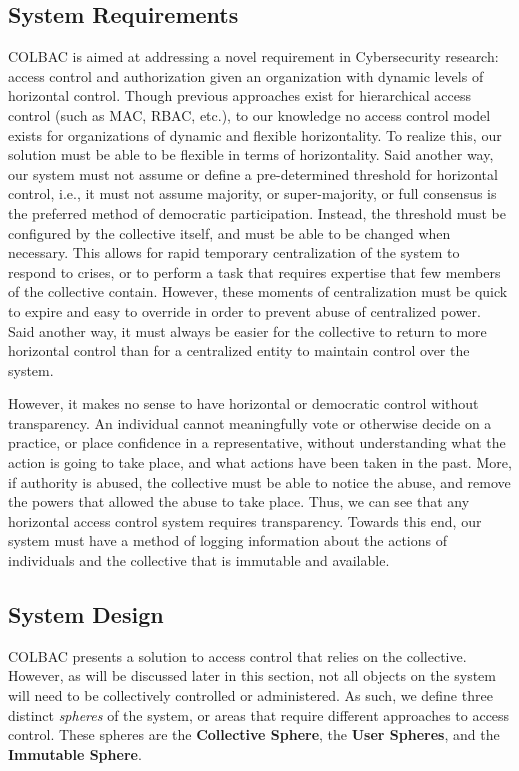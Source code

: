 \subsection{System Requirements}
\label{sec:colbacrequirements}
COLBAC is aimed at addressing a novel requirement in Cybersecurity research:
access control and authorization given an organization with dynamic levels of
horizontal control. Though previous approaches exist for hierarchical access
control (such as MAC, RBAC, etc.), to our knowledge no access control model
exists for organizations of dynamic and flexible horizontality. To realize
this, our solution must be able to be flexible in terms of horizontality. Said
another way, our system must not assume or define a pre-determined threshold for
horizontal control, i.e., it must not assume majority, or super-majority, or
full consensus is the preferred method of democratic participation. Instead,
the threshold must be configured by the collective itself, and must be able to
be changed when necessary. This allows for rapid temporary centralization of the
system to respond to crises, or to perform a task that requires expertise that
few members of the collective contain. However, these moments of centralization
must be quick to expire and easy to override in order to prevent abuse of
centralized power. Said another way, it must always be easier for the collective
to return to more horizontal control than for a centralized entity to maintain
control over the system.

However, it makes no sense to have horizontal or democratic control without
transparency. An individual cannot meaningfully vote or otherwise decide on a
practice, or place confidence in a representative, without understanding what
the action is going to take place, and what actions have been taken in the past.
More, if authority is abused, the collective must be able to notice the abuse,
and remove the powers that allowed the abuse to take place. Thus, we can see
that any horizontal access control system requires transparency. Towards this
end, our system must have a method of logging information about the actions of
individuals and the collective that is immutable and available.

\subsection{System Design}
\label{sec:colbacdesign}
COLBAC presents a solution to access control that relies on the collective.
However, as will be discussed later in this section, not all objects on the
system will need to be collectively controlled or administered. As such, we
define three distinct \textit{spheres} of the system, or areas that require
different approaches to access control. These spheres are the \textbf{Collective
Sphere}, the \textbf{User Spheres}, and the \textbf{Immutable Sphere}.

